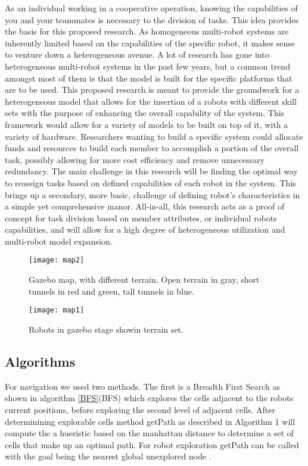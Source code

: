 As an individual working in a cooperative operation, knowing the capabilities
of you and your teammates is necessary to the division of tasks. This idea
provides the basis for this proposed research. As homogeneous multi-robot systems
are inherently limited based on the capabilities of the specific robot,
it makes sense to venture down a heterogeneous avenue. A lot of research
has gone into heterogeneous multi-robot systems in the past few years, but a
common trend amongst most of them is that the model is built for the specific
platforms that are to be used. This proposed research is meant to provide the
groundwork for a heterogeneous model that allows for the insertion of a
robots with different skill sets with the purpose of enhancing the overall
capability of the system. This framework would allow for a variety of models
to be built on top of it, with a variety of hardware. Researchers wanting to
build a specific system could allocate funds and resources to build each member
to accomplish a portion of the overall task, possibly allowing for more cost
efficiency and remove unnecessary redundancy. The main challenge in this
research will be finding the optimal way to reassign tasks based on defined
capabilities of each robot in the system. This brings up a secondary, more basic,
challenge of defining robot’s characteristics in a simple yet comprehensive manor.
All-in-all, this research acts as a proof of concept for task division based on member
attributes, or individual robots capabilities, and will allow for a high degree of
heterogeneous utilization and multi-robot model expansion.

\begin{figure}[H]
  \centering
    \texttt{[image: map2]}
  \caption{Gazebo map, with different terrain. Open terrain in gray, short tunnels in red and green, tall tunnels in blue.} \label{fig:map}
\end{figure}

\begin{figure}[H]
  \centering
    \texttt{[image: map1]}
  \caption{Robots in gazebo stage showin terrain set.}
  \label{fig:stage}
\end{figure}

\subsection{Algorithms}
For navigation we used two methods. The first is a Breadth First Search as shown in algorithm \ref{BFS}(BFS) which explores the cells adjacent to the robots
current positions, before exploring the second level of adjacent cells. After determinining explorable cells method getPath as described in Algorithm 1 will compute the a hueristic based on the manhattan distance to determine a set of cells that make up an optimal path. For robot exploration getPath can be called with the goal being the nearest global unexplored node \cite{pound}.


